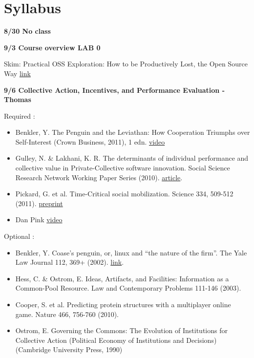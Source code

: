 \section{Syllabus}

\textbf{8/30 No class}

\textbf{9/3 Course overview LAB 0}

Skim: Practical OSS Exploration: How to be Productively Lost, the Open
Source Way
\href{http://quaid.fedorapeople.org/TOS/Practical_Open_Source_Software_Exploration/html/}{link}

\textbf{9/6 Collective Action, Incentives, and Performance Evaluation -
Thomas}

Required :

\begin{itemize}
\itemsep1pt\parskip0pt
\item
  Benkler, Y. The Penguin and the Leviathan: How Cooperation Triumphs
  over Self-Interest (Crown Business, 2011), 1 edn.
  \href{http://www.youtube.com/watch?v=dPbE3WieoUo}{video}
\item
  Gulley, N. \& Lakhani, K. R. The determinants of individual
  performance and collective value in Private-Collective software
  innovation. Social Science Research Network Working Paper Series
  (2010). \href{http://ssrn.com/abstract=1550352}{article}.
\item
  Pickard, G. et al. Time-Critical social mobilization. Science 334,
  509-512 (2011). \href{http://arxiv.org/abs/1008.3172}{preprint}
\item
  Dan Pink \href{http://www.youtube.com/watch?v=KgGhSOAtAyQ}{video}
\end{itemize}

Optional :

\begin{itemize}
\itemsep1pt\parskip0pt
\item
  Benkler, Y. Coase's penguin, or, linux and ``the nature of the firm''.
  The Yale Law Journal 112, 369+ (2002).
  \href{http://dx.doi.org/10.2307/1562247}{link}.
\item
  Hess, C. \& Ostrom, E. Ideas, Artifacts, and Facilities: Information
  as a Common-Pool Resource. Law and Contemporary Problems 111-146
  (2003).
\item
  Cooper, S. et al. Predicting protein structures with a multiplayer
  online game. Nature 466, 756-760 (2010).
\item
  Ostrom, E. Governing the Commons: The Evolution of Institutions for
  Collective Action (Political Economy of Institutions and Decisions)
  (Cambridge University Press, 1990)
\end{itemize}


